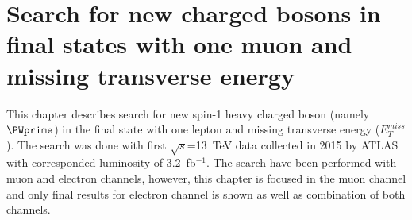 \chapter{Search for new charged bosons in final states with one muon and missing transverse energy}
\label{chap:Wprime}



This chapter describes search for new spin-1 heavy charged boson (namely $\PWprime$) in the final state with one lepton and missing transverse energy ($E_T^{miss}$).
The search was done with first $\sqrt{s}$=13~TeV data collected in 2015 by ATLAS with corresponded luminosity of 3.2~fb$^{-1}$. The search have been performed with muon and electron channels, however, this chapter is focused in the muon channel and only final results for electron channel is shown as well as combination of both channels.



% 
% 
% 
% 


